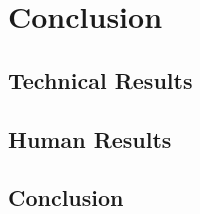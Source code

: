 \documentclass{book}
\begin{document}
\chapter{Conclusion}
	\section{Technical Results}
	\section{Human Results} 
	\section{Conclusion} 

\newpage

\printglossaries\label{glossary}







\pagestyle{empty}
\newpage

\ifthenelse{\isodd{\value{page}}}
{}%
{\hbox{}\clearpage}%


\end{document}
